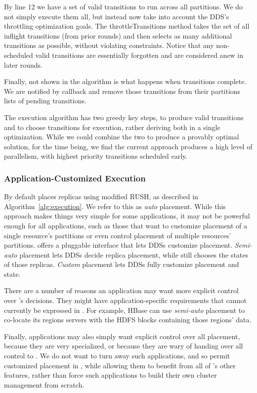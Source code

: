 By line 12 we have a set of valid transitions to run
across all partitions.  We do not simply execute them all, but instead now take
into account the DDS's throttling optimization goals.  The throttleTransitions
method takes the set of all inflight transitions (from prior rounds) and then
selects as many additional transitions as possible, without violating
constraints.  Notice that any non-scheduled valid transitions are essentially
forgotten and are considered anew in later rounds.

Finally, not shown in the algorithm is what happens when transitions complete.
We are notified by callback and remove those transitions from their partitions
lists of pending transitions.

The execution algorithm has two greedy key steps, to produce valid transitions and to
choose transitions for execution, rather deriving both in a single optimization.
While we could combine the two to produce a provably optimal solution, for the
time being, we find the current approach produces a high level of parallelism,
with highest priority transitions scheduled early.

\subsubsection{Application-Customized Execution}
\label{sec:placement}
%
By default \helix places replicas using modified RUSH, as described in
Algorithm~\ref{alg:execution}.  We refer to this as \emph{auto} placement.  
While this approach makes things very simple for some applications, it may not
be powerful enough for all applications, such as those that want to customize
placement of a single resource's partitions or even control placement of
multiple resources' partitions. 
\helix offers a pluggable interface 
that lets DDSs customize placement.  \emph{Semi-auto} placement lets DDSs decide
replica placement, while \helix still chooses the states of those replicas.
\emph{Custom} placement lets DDSs fully customize placement and state.

There are a number of reasons an application may want more explicit control over
\helix's decisions.  They might have application-specific requirements that
cannot currently be expressed in \helix.  For example, HBase can use \emph{semi-auto}
placement to co-locate its regions servers with the HDFS blocks
containing those regions' data.  

Finally, applications may also simply want explicit
control over all placement, because they are very specialized, or because they
are wary of handing over all control to \helix.   We do not want to turn away
such applications, and so permit customized placement in \helix, while allowing
them to benefit from all of \helix's other features, rather than 
force such applications to build their own cluster management from scratch.

